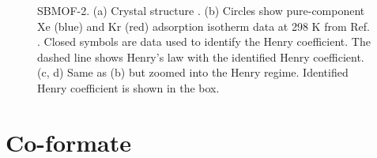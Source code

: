     \begin{figure}[h!]
       \centering
  
       
       \caption{SBMOF-2. (a) Crystal structure \cite{SBMOF-2_structure}.
       (b) Circles show pure-component Xe (blue) and Kr (red) adsorption isotherm data at 298 K from Ref. \cite{SBMOF-2_XeKr}. 
       Closed symbols are data used to identify the Henry coefficient. The dashed line shows Henry's law with the identified Henry coefficient.
       (c, d) Same as (b) but zoomed into the Henry regime. Identified Henry coefficient is shown in the box.}
    \end{figure}
    
    \clearpage
    
    
    \section{Co-formate}
    
